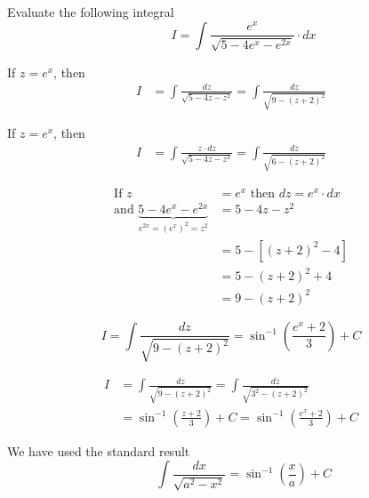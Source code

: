 \documentclass[14pt,fleqn]{extarticle}
\begin{document}
\newcommand\dnm{5-4e^x-e^{2x}}
\newcommand\zply{5-4z-z^2}
\newcommand\psqr{9- \left(z +2 \right)^2}

Evaluate the following integral \[ \qquad I = \int \frac{e^x}{\sqrt{\dnm}}\cdot dx \]
%

\newcard

If $z = e^x$, then 
\begin{align}
I &= \int \frac{dz}{\sqrt{\zply}} = \int \frac{dz}{\sqrt{\psqr}}
\end{align}

\newcard 

If $z = e^x$, then 
\begin{align}
I &= \int \frac{z\cdot dz}{\sqrt{\zply}} = \int \frac{dz}{\sqrt{6- \left(z+2 \right)^2}}
\end{align}

\newcard 

\begin{align}
	\text{If } z &= e^x \text{ then } dz = e^x\cdot dx \\
	\text{and } \underbrace{\dnm}_{ e^{2x} = \left(e^x \right)^2 = z^2} &= \zply  \\
	&= 5 - \left[\left(z+2 \right)^2 - 4\right] \\
	&= 5 - \left(z+2 \right)^2 + 4 \\
	&= 9 - \left(z+2 \right)^2
\end{align}

\newcard 

\[ I = \int \frac{dz}{\sqrt{\psqr}} = \sin^{-1} \left(\frac{e^x+2}{3} \right) + C\]

\newcard 

\begin{align}
I &= \int \frac{dz}{\sqrt{\psqr}} = \int \frac{dz}{\sqrt{3^2 - \left(z+2 \right)^2}} \\ 
&= \sin^{-1} \left(\frac{z+2}{3} \right) + C = \sin^{-1} \left(\frac{e^x + 2}{3} \right) + C 
\end{align}

We have used the standard result 
\[ \qquad \int \frac{dx}{\sqrt{a^2 - x^2}} = \sin^{-1} \left(\frac{x}{a} \right) + C \] 
\end{document}

